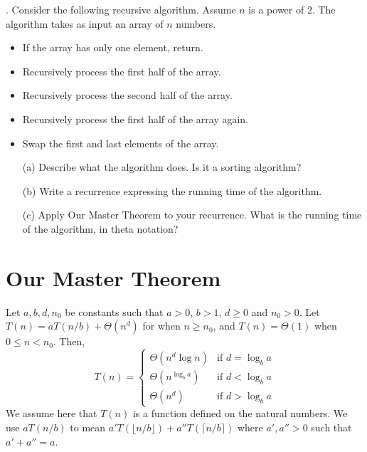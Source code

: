 \documentclass{article}
\begin{document}
. Consider the following recursive algorithm. Assume $n$ is a power of 2.  The algorithm takes as input an array of $n$ numbers.

\begin{itemize}
    \item If the array has only one element, return.
    \item Recursively process the first half of the array.
    \item Recursively process the second half of the array.
    \item Recursively process the first half of the array again.
    \item Swap the first and last elements of the array.
\end{itemize}


\begin{enumerate}
    \item[(a)]  Describe what the algorithm does. Is it a sorting algorithm?
    \item[(b)] Write a recurrence expressing the running time of the algorithm.
    \item[(c)] Apply Our Master Theorem to your recurrence. What is the running time of the algorithm, in theta notation?
\end{enumerate}

\clearpage

\section*{Our Master Theorem}

\begin{theorem}
Let $a, b, d, n_0$ be constants such that $a > 0$, $b > 1$, $d \ge 0$ and $n_0 > 0$. Let $T(n) = aT(n/b) + \Theta(n^d)$ for when $n \ge n_0$, and $T(n) = \Theta(1)$ when $0 \le n < n_0$. Then,
\[
T(n) = \begin{cases}
\Theta(n^d \log n) & \text{if } d = \log_b a \\
\Theta(n^{\log_b a}) & \text{if } d < \log_b a \\
\Theta(n^d) & \text{if } d > \log_b a
\end{cases}
\]
We assume here that $T(n)$ is a function defined on the natural numbers. We use $aT(n/b)$ to mean $a'T(\lfloor n/b \rfloor) + a''T(\lceil n/b \rceil)$ where $a', a'' > 0$ such that $a' + a'' = a$.
\end{theorem}
\end{document}
